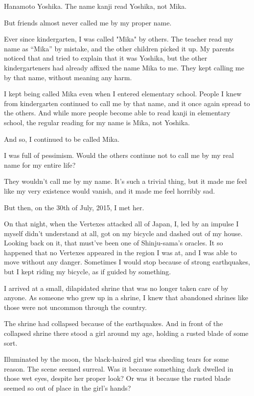 

Hanamoto Yoshika. The name kanji read Yoshika, not Mika.

But friends almost never called me by my proper name.

Ever since kindergarten, I was called "Mika" by others. The teacher read my name as ``Mika'' by mistake, and the other children picked it up. My parents noticed that and tried to explain that it was Yoshika, but the other kindergarteners had already affixed the name Mika to me. They kept calling me by that name, without meaning any harm.

I kept being called Mika even when I entered elementary school. People I knew from kindergarten continued to call me by that name, and it once again spread to the others. And while more people become able to read kanji in elementary school, the regular reading for my name is Mika, not Yoshika.

And so, I continued to be called Mika.

I was full of pessimism. Would the others continue not to call me by my real name for my entire life?

They wouldn't call me by my name. It's such a trivial thing, but it made me feel like my very existence would vanish, and it made me feel horribly sad.

But then, on the 30th of July, 2015, I met her.

On that night, when the Vertexes attacked all of Japan, I, led by an impulse I myself didn't understand at all, got on my bicycle and dashed out of my house. Looking back on it, that must've been one of Shinju-sama's oracles. It so happened that no Vertexes appeared in the region I was at, and I was able to move without any danger. Sometimes I would stop because of strong earthquakes, but I kept riding my bicycle, as if guided by something.

I arrived at a small, dilapidated shrine that was no longer taken care of by anyone. As someone who grew up in a shrine, I knew that abandoned shrines like those were not uncommon through the country.

The shrine had collapsed because of the earthquakes. And in front of the collapsed shrine there stood a girl around my age, holding a rusted blade of some sort.

Illuminated by the moon, the black-haired girl was sheeding tears for some reason. The scene seemed surreal. Was it because something dark dwelled in those wet eyes, despite her proper look? Or was it because the rusted blade seemed so out of place in the girl's hands?

